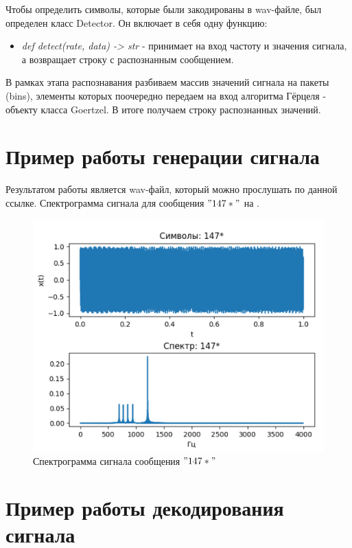 Чтобы определить символы, которые были закодированы в wav-файле, был определен класс Detector. Он включает в себя одну функцию:

\begin{itemize}
	\item \textit{def detect(rate, data) -> str} - принимает на вход частоту и значения сигнала, а возвращает строку с распознанным сообщением.
\end{itemize}

В рамках этапа распознавания разбиваем массив значений сигнала на пакеты (bins), элементы которых поочередно передаем на вход алгоритма Гёрцеля - объекту класса Goertzel. В итоге получаем строку распознанных значений.

\section{Пример работы генерации сигнала}

Результатом работы является wav-файл, который можно прослушать по данной ссылке. Спектрограмма сигнала для сообщения $"147*"$ на .

\begin{figure}[ht] 
	\center
	\includegraphics [scale=0.7] {my_folder/images/step-9}
	\caption{Спектрограмма сигнала сообщения $"147*"$} 
	\label{fig:step-9}
	\end{figure}

\section{Пример работы декодирования сигнала}

